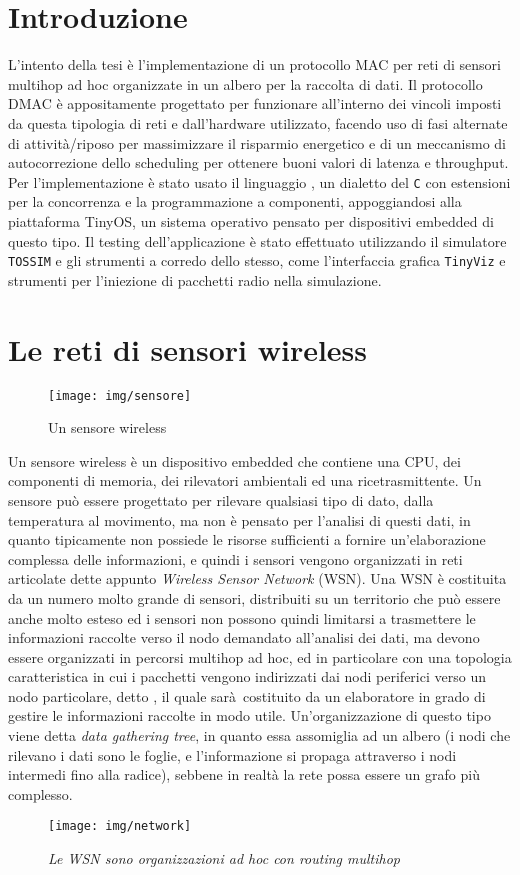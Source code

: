 \documentclass[twoside,11pt,a4paper,italian,openany]{book}
\newcommand{\tv}{\texttt{TinyViz} }
\newcommand{\tos}{\texttt{TOSSIM} }
\begin{document}
\chapter{Introduzione}
L'intento della tesi è l'implementazione di un protocollo MAC per reti di sensori 
multihop ad hoc organizzate in un albero per la raccolta di dati.
Il protocollo DMAC è appositamente progettato per funzionare all'interno dei vincoli 
imposti da questa tipologia di reti e dall'hardware utilizzato, 
facendo uso di fasi alternate di attività/riposo per massimizzare 
il risparmio energetico e di un meccanismo di autocorrezione dello scheduling per 
ottenere buoni valori di latenza e throughput.
Per l'implementazione è stato usato il linguaggio \nesc, un dialetto del \texttt{C}
con estensioni per la concorrenza e la programmazione a componenti, 
appoggiandosi alla piattaforma TinyOS, un sistema operativo pensato per dispositivi embedded di questo tipo.  Il testing dell'applicazione è stato effettuato utilizzando il simulatore \tos  
e gli strumenti a corredo dello stesso, come l'interfaccia grafica \tv e strumenti 
per l'iniezione di pacchetti radio nella simulazione.



\chapter{Le reti di sensori wireless}
\begin{figure}
\caption{Un sensore wireless}
\texttt{[image: img/sensore]}
\end{figure}

Un sensore wireless è un dispositivo embedded che contiene una CPU, dei componenti di memoria, 
dei rilevatori ambientali  ed una ricetrasmittente. Un sensore può essere progettato per 
rilevare qualsiasi tipo di dato, dalla temperatura al movimento, ma non è pensato per l'analisi 
di questi dati, in quanto tipicamente non possiede le risorse sufficienti a fornire 
un'elaborazione complessa delle informazioni, e quindi i sensori vengono organizzati 
in reti articolate dette appunto \emph{Wireless Sensor Network} (WSN).
Una WSN è costituita da un numero molto grande di sensori, distribuiti su un territorio che può essere anche molto esteso ed i sensori non possono quindi limitarsi a trasmettere 
le informazioni raccolte verso il nodo demandato all'analisi dei dati, ma devono essere 
organizzati in percorsi multihop ad hoc, ed in particolare con una topologia caratteristica in 
cui i pacchetti vengono indirizzati dai nodi periferici verso un nodo particolare, detto \sink, 
il quale sarà costituito da un elaboratore in grado di gestire le informazioni raccolte 
in modo utile. Un'organizzazione di questo tipo viene detta \emph{data gathering tree}, 
in quanto essa assomiglia ad un albero (i nodi che rilevano i dati sono le foglie, e 
l'informazione si propaga attraverso i nodi intermedi fino alla radice), sebbene in realtà 
la rete possa essere un grafo più complesso. 
\begin{figure}
\caption{\emph{Le WSN sono organizzazioni ad hoc con routing multihop}}
\texttt{[image: img/network]}
\end{figure}
\end{document}
